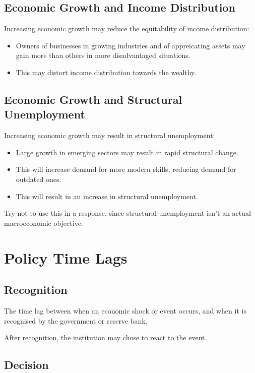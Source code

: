 \documentclass[a4paper,11pt]{report}
\begin{document}
\subsection{Economic Growth and Income Distribution}

Increasing economic growth may reduce the equitability of income distribution:

\begin{itemize}
\item Owners of businesses in growing industries and of appreicating assets may
	gain more than others in more disadvantaged situations.
\item This may distort income distribution towards the wealthy.
\end{itemize}

\subsection{Economic Growth and Structural Unemployment}

Increasing economic growth may result in structural unemployment:

\begin{itemize}
\item Large growth in emerging sectors may result in rapid structural change.
\item This will increase demand for more modern skills, reducing demand for
	outdated ones.
\item This will result in an increase in structural unemployment.
\end{itemize}

Try not to use this in a response, since structural unemployment isn't an actual
macroeconomic objective.


\section{Policy Time Lags}

\subsection{Recognition}

The time lag between when an economic shock or event occurs, and when it is
recognised by the government or reserve bank.

After recognition, the institution may chose to react to the event.

\subsection{Decision}
\end{document}
